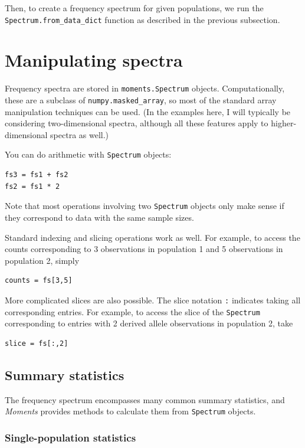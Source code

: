 \documentclass[12pt]{article}
\makeatletter
\newcommand{\py}[1]{\lstinline[breaklines=true,language=Python, showstringspaces=False]@#1@}
\makeatother
\begin{document}
Then, to create a frequency spectrum for given populations, we run the \py{Spectrum.from_data_dict} function as described in the previous subsection.


\section{Manipulating spectra}\label{sec:manip}

Frequency spectra are stored in \py{moments.Spectrum} objects.
Computationally, these are a subclass of \py{numpy.masked_array}, so most of the standard array manipulation techniques can be used.
(In the examples here, I will typically be considering two-dimensional spectra, although all these features apply to higher-dimensional spectra as well.)

You can do arithmetic with \py{Spectrum} objects:
\begin{lstlisting}
fs3 = fs1 + fs2
fs2 = fs1 * 2
\end{lstlisting}
Note that most operations involving two \py{Spectrum} objects only make sense if they correspond to data with the same sample sizes.

Standard indexing and slicing operations work as well.
For example, to access the counts corresponding to 3 observations in population 1 and 5 observations in population 2, simply
\begin{lstlisting}
counts = fs[3,5]
\end{lstlisting}
More complicated slices are also possible.
The slice notation \py{:} indicates taking all corresponding entries.
For example, to access the slice of the \py{Spectrum} corresponding to entries with 2 derived allele observations in population 2, take
\begin{lstlisting}
slice = fs[:,2]
\end{lstlisting}

\subsection{Summary statistics}

The frequency spectrum encompasses many common summary statistics, and \textit{Moments} provides methods to calculate them from \py{Spectrum} objects.

\subsubsection{Single-population statistics}
\end{document}
